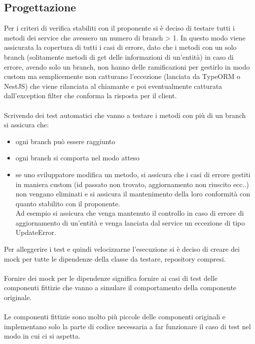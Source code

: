 \subsection{Progettazione}
Per i criteri di verifica stabiliti con il proponente si è deciso di testare tutti i metodi dei service che
avessero un numero di branch > 1. In questo modo viene assicurata la copertura di tutti i casi di errore,
dato che i metodi con un solo branch (solitamente metodi di get delle informazioni di un'entità) in caso 
di errore, avendo solo un branch, non hanno delle ramificazioni per gestirlo in modo custom ma 
semplicemente non catturano l'eccezione (lanciata da TypeORM o NestJS) che viene rilanciata al chiamante 
e poi eventualmente catturata dall'exception filter che conforma la risposta per il client.
\\\\
Scrivendo dei test automatici che vanno a testare i metodi con più di un branch si assicura che:
\begin{itemize}
    \item ogni branch può essere raggiunto
    \item ogni branch si comporta nel modo atteso
    \item se uno sviluppatore modifica un metodo, si assicura che i casi di errore gestiti in maniera custom (id passato non trovato, 
    aggiornamento non riuscito ecc..) non vengano eliminati e si assicura il mantenimento della loro
    conformità con quanto stabilito con il proponente. 
    \\
    Ad esempio si assicura che venga mantenuto il controllo in caso di errore di aggiornamento di un'entità e
    venga lanciata dal service un eccezione di tipo UpdateError.
\end{itemize}
\leavevmode\newline
Per alleggerire i test e quindi velocizzarne l'esecuzione si è deciso di creare dei \gls{mock} per tutte le dipendenze
della classe da testare, repository compresi.
\\\\
Fornire dei \gls{mock} per le dipendenze significa fornire ai casi di test delle componenti fittizie che vanno a simulare
il comportamento della componente originale. 
\\\\
Le componenti fittizie sono molto più piccole delle componenti originali e implementano solo la parte di codice 
necessaria a far funzionare il caso di test nel modo in cui ci si aspetta.
\\\\
